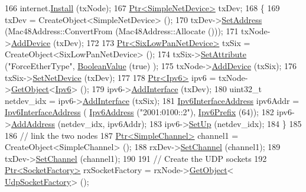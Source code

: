 \begin{DoxyCode}
166   internet.\hyperlink{classns3_1_1InternetStackHelper_a6645b412f31283d2d9bc3d8a95cebbc0}{Install} (txNode);
167   \hyperlink{classns3_1_1Ptr}{Ptr<SimpleNetDevice>} txDev;
168   \{
169     txDev = CreateObject<SimpleNetDevice> ();
170     txDev->\hyperlink{classns3_1_1SimpleNetDevice_a968ef3e7318bac29d5f1d7d977029af4}{SetAddress} (Mac48Address::ConvertFrom (Mac48Address::Allocate ()));
171     txNode->\hyperlink{classns3_1_1Node_a42ff83ee1d5d1649c770d3f5b62375de}{AddDevice} (txDev);
172 
173     \hyperlink{classns3_1_1Ptr}{Ptr<SixLowPanNetDevice>} txSix = CreateObject<SixLowPanNetDevice> ();
174     txSix->\hyperlink{classns3_1_1ObjectBase_ac60245d3ea4123bbc9b1d391f1f6592f}{SetAttribute} (\textcolor{stringliteral}{"ForceEtherType"}, \hyperlink{classns3_1_1BooleanValue}{BooleanValue} (\textcolor{keyword}{true}) );
175     txNode->\hyperlink{classns3_1_1Node_a42ff83ee1d5d1649c770d3f5b62375de}{AddDevice} (txSix);
176     txSix->\hyperlink{classns3_1_1SixLowPanNetDevice_a81c74a5dc06e3fbad1a8b1c59d1f68fa}{SetNetDevice} (txDev);
177 
178     \hyperlink{classns3_1_1Ptr}{Ptr<Ipv6>} ipv6 = txNode->\hyperlink{classns3_1_1Object_a13e18c00017096c8381eb651d5bd0783}{GetObject}<\hyperlink{classns3_1_1Ipv6}{Ipv6}> ();
179     ipv6->\hyperlink{classns3_1_1Ipv6_a4fd7da82c16b8abf9ca15f982918e6a4}{AddInterface} (txDev);
180     uint32\_t netdev\_idx = ipv6->\hyperlink{classns3_1_1Ipv6_a4fd7da82c16b8abf9ca15f982918e6a4}{AddInterface} (txSix);
181     \hyperlink{classns3_1_1Ipv6InterfaceAddress}{Ipv6InterfaceAddress} ipv6Addr = \hyperlink{classns3_1_1Ipv6InterfaceAddress}{Ipv6InterfaceAddress} (
      \hyperlink{classns3_1_1Ipv6Address}{Ipv6Address} (\textcolor{stringliteral}{"2001:0100::2"}), \hyperlink{classns3_1_1Ipv6Prefix}{Ipv6Prefix} (64));
182     ipv6->\hyperlink{classns3_1_1Ipv6_a5cd576e83cf65445be3a0b5ffd1ddc5c}{AddAddress} (netdev\_idx, ipv6Addr);
183     ipv6->\hyperlink{classns3_1_1Ipv6_a8e61d85ec7fd342ed38fef2d040ed1b9}{SetUp} (netdev\_idx);
184   \}
185 
186   \textcolor{comment}{// link the two nodes}
187   \hyperlink{classns3_1_1Ptr}{Ptr<SimpleChannel>} channel1 = CreateObject<SimpleChannel> ();
188   rxDev->\hyperlink{classns3_1_1SimpleNetDevice_af9e9828ad584b5ba538f18f645f162e0}{SetChannel} (channel1);
189   txDev->\hyperlink{classns3_1_1SimpleNetDevice_af9e9828ad584b5ba538f18f645f162e0}{SetChannel} (channel1);
190 
191   \textcolor{comment}{// Create the UDP sockets}
192   \hyperlink{classns3_1_1Ptr}{Ptr<SocketFactory>} rxSocketFactory = rxNode->\hyperlink{classns3_1_1Object_a13e18c00017096c8381eb651d5bd0783}{GetObject}<
      \hyperlink{classns3_1_1UdpSocketFactory}{UdpSocketFactory}> ();

\end{DoxyCode}
